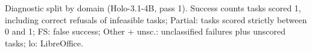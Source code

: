 \begin{table}[h]
\centering\small

\caption{Diagnostic split by domain (Holo-3.1-4B, pass 1). Success counts tasks scored 1, including correct refusals of infeasible tasks; Partial: tasks scored strictly between 0 and 1; FS: false success; Other + unsc.: unclassified failures plus unscored tasks; lo: LibreOffice.}
\label{tab:osw-domains}
\end{table}
